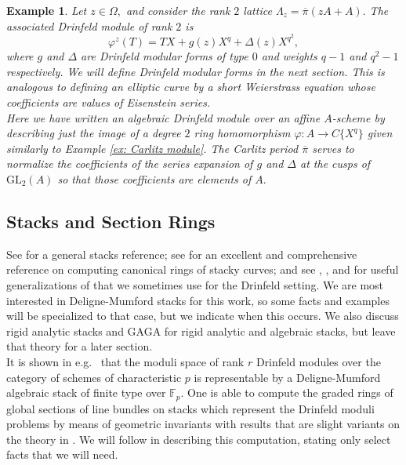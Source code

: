 \documentclass[11pt]{amsart}
\newtheorem{example}[theorem]{Example}
\theoremstyle{definition}
\numberwithin{equation}{section}
\newcommand{\GL}{\mathrm{GL}} 	%
\newcommand{\bbF}{\mathbb{F}}		%
\begin{document}
		\begin{example}
			Let $z\in \Omega,$ and consider the rank $2$ lattice $\Lambda_z=\overline{\pi}(zA+A).$ The associated Drinfeld module of rank $2$ is 
			\[\varphi^z(T)=TX+g(z)X^q+\Delta(z)X^{q^2},\]
			where $g$ and $\Delta$ are Drinfeld modular forms of type $0$ and weights $q-1$ and $q^2-1$ respectively. We will define Drinfeld modular forms in the next section. This is analogous to defining an elliptic curve by a short Weierstrass equation whose coefficients are values of Eisenstein series.\\
			
			Here we have written an algebraic Drinfeld module over an affine $A$-scheme by describing just the image of a degree $2$ ring homomorphism $\varphi: A\to C\{X^q\}$ given similarly to Example \ref{ex: Carlitz module}. The Carlitz period $\overline{\pi}$ serves to normalize the coefficients of the series expansion of $g$ and $\Delta$ at the cusps of $\GL_2(A)$ so that those coefficients are elements of $A.$
		\end{example}
		
		\subsection{Stacks and Section Rings}
		
		See \cite{Alper-Stacks-and-Moduli} for a general stacks reference; see \cite{VZB} for an excellent and comprehensive reference on computing canonical rings of stacky curves; and see \cite{ODorney-canonical-rings-Q-divisors-on-P1}, \cite{Cerchia-Franklin-ODorney-Qdiv-Ell-curves}, and \cite{Landesman-Ruhm-Zhang-Spin-canonical-rings} for useful generalizations of \cite{VZB} that we sometimes use for the Drinfeld setting. We are most interested in Deligne-Mumford stacks for this work, so some facts and examples will be specialized to that case, but we indicate when this occurs. We also discuss rigid analytic stacks and GAGA for rigid analytic and algebraic stacks, but leave that theory for a later section. \\ 
		
		It is shown in e.g.\ \cite[Corollary $1.4.3$]{Laumon-cohomology-Drinfeld-modular-varieties} that the moduli space of rank $r$ Drinfeld modules over the category of schemes of characteristic $p$ is representable by a Deligne-Mumford algebraic stack of finite type over $\bbF_p.$ 
		One is able to compute the graded rings of global sections of line bundles on stacks which represent the Drinfeld moduli problems by means of geometric invariants with results that are slight variants on the theory in \cite{VZB}. We will follow \cite{VZB} in describing this computation, stating only select facts that we will need.\\
		
\end{document}
